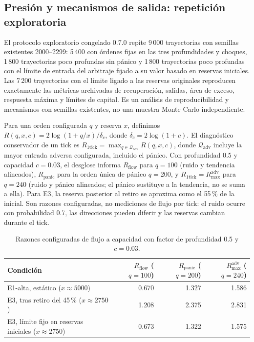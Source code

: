 \subsection{Presión y mecanismos de salida: repetición exploratoria}

El protocolo exploratorio congelado 0.7.0 repite 9\,000 trayectorias con semillas existentes 2000--2299: 5\,400 con órdenes fijas en las tres profundidades y choques, 1\,800 trayectorias poco profundas sin pánico y 1\,800 trayectorias poco profundas con el límite de entrada del arbitraje fijado a su valor basado en reservas iniciales. Las 7\,200 trayectorias con el límite ligado a las reservas originales reproducen exactamente las métricas archivadas de recuperación, salidas, área de exceso, respuesta máxima y límites de capital. Es un análisis de reproducibilidad y mecanismos con semillas existentes, no una muestra Monte Carlo independiente.

Para una orden configurada $q$ y reserva $x$, definimos $R(q,x,c)=2\log(1+q/x)/\delta_c$, donde $\delta_c=2\log(1+c)$. El diagnóstico conservador de un tick es $R_{\mathrm{1tick}}=\max_{q\in\mathcal Q_{\mathrm{adv}}}R(q,x,c)$, donde $\mathcal Q_{\mathrm{adv}}$ incluye la mayor entrada adversa configurada, incluido el pánico. Con profundidad 0.5 y capacidad $c=0.03$, el desglose informa $R_{\mathrm{flow}}$ para $q=100$ (ruido y tendencia alineados), $R_{\mathrm{panic}}$ para la orden única de pánico $q=200$, y $R_{\mathrm{1tick}}=R_{\max}^{\mathrm{adv}}$ para $q=240$ (ruido y pánico alineados; el pánico sustituye a la tendencia, no se suma a ella). Para E3, la reserva posterior al retiro se aproxima como el 55\,\% de la inicial. Son razones configuradas, no mediciones de flujo por tick: el ruido ocurre con probabilidad 0.7, las direcciones pueden diferir y las reservas cambian durante el tick.

\begin{table}[htbp]
\centering
\caption{Razones configuradas de flujo a capacidad con factor de profundidad 0.5 y $c=0.03$.}
\label{tab:pressure-ratio}
\small
\begin{tabular}{@{}lrrr@{}}
\toprule
Condición & $R_{\mathrm{flow}}$ ($q=100$) & $R_{\mathrm{panic}}$ ($q=200$) & $R_{\max}^{\mathrm{adv}}$ ($q=240$) \\
\midrule
E1-alta, estático ($x\approx5000$) & 0.670 & 1.327 & 1.586 \\
E3, tras retiro del 45\,\% ($x\approx2750$) & 1.208 & 2.375 & 2.831 \\
E3, límite fijo en reservas iniciales ($x\approx2750$) & 0.673 & 1.322 & 1.575 \\
\bottomrule
\end{tabular}
\end{table}


